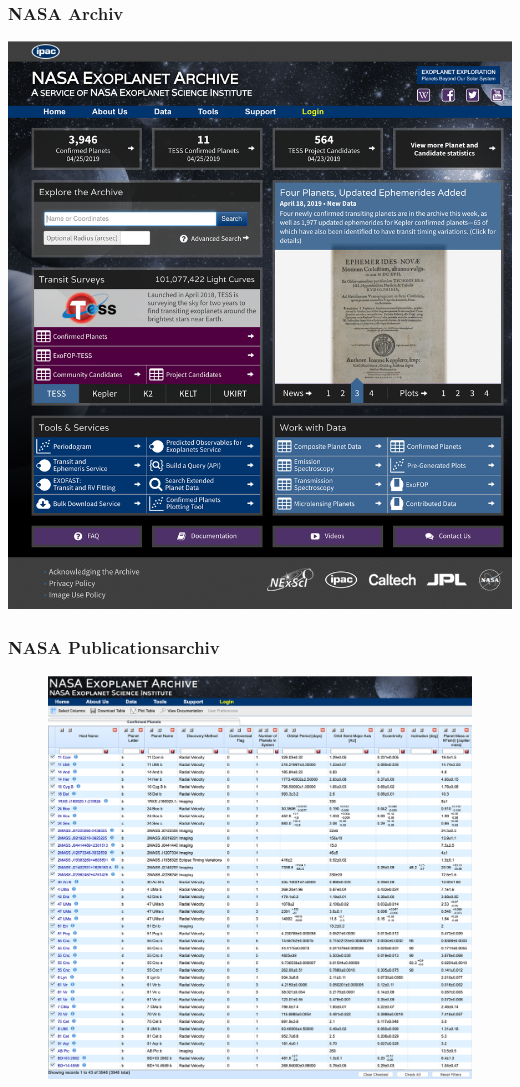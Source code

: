 \documentclass[11pt]{beamer}
\begin{document}
\begin{frame}
	\frametitle{NASA Archiv}
	\centering
	\includegraphics[width=1\linewidth]{screenshot003}
\end{frame}


\begin{frame}
	\frametitle{NASA Publicationsarchiv}
	\begin{figure}
		\centering
		\includegraphics[width=1\linewidth]{screenshot005}
		\caption{}
		\label{fig:screenshot005}
	\end{figure}
\end{frame}
\end{document}

